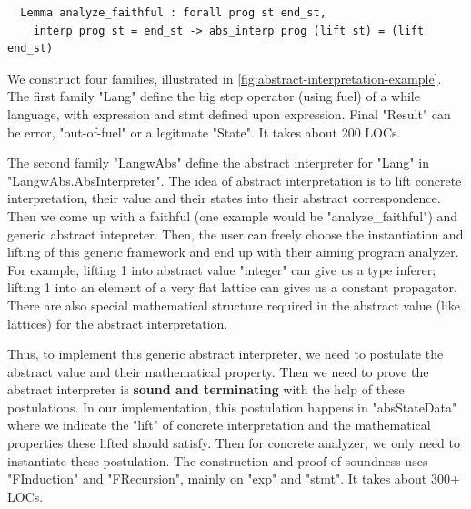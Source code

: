 \begin{verbatim}
  Lemma analyze_faithful : forall prog st end_st, 
    interp prog st = end_st -> abs_interp prog (lift st) = (lift end_st)
\end{verbatim}
  

We construct four families, illustrated in \cref{fig:abstract-interpretation-example}.
The first family "Lang" define the big step operator (using fuel) of a
while language, with expression and stmt defined upon expression. Final "Result" can be error, "out-of-fuel" or a legitmate "State". It takes about 200 LOCs. 

The second family "LangwAbs" define the abstract interpreter for "Lang" in "LangwAbs.AbsInterpreter".
The idea of abstract interpretation is to lift concrete interpretation, their value and their states into their abstract correspondence. Then we come up with a faithful (one example would be "analyze_faithful") and generic abstract intepreter. Then, the user can freely choose the instantiation and lifting of this generic framework and end up with their aiming program analyzer. For example, lifting 1 into abstract value "integer" can give us a type inferer; lifting 1 into an element of a very flat lattice can gives us a constant propagator. There are also special mathematical structure required in the abstract value (like lattices) for the abstract interpretation. 

Thus, to implement this generic abstract interpreter, we need to postulate the abstract value and their mathematical property. Then we need to prove the abstract interpreter is \textbf{sound and terminating}  with the help of these postulations. In our implementation, this postulation happens in "absStateData" where we indicate the "lift" of concrete interpretation and the mathematical properties these lifted should satisfy. Then for concrete analyzer, we only need to instantiate these postulation. The construction and proof of soundness uses "FInduction" and "FRecursion", mainly on "exp" and "stmt". 
It takes about 300+ LOCs. 


